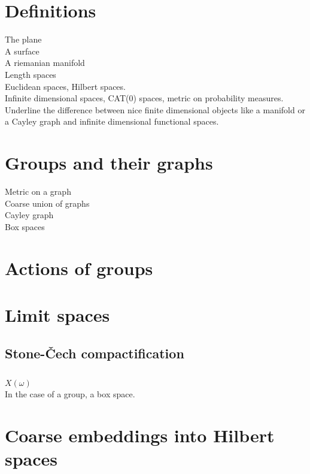 \section{Definitions}

The plane\\
A surface\\
A riemanian manifold\\
Length spaces\\

Euclidean spaces, Hilbert spaces.\\
Infinite dimensional spaces, CAT(0) spaces, metric on probability measures.\\

Underline the difference between nice finite dimensional objects like a manifold or a Cayley graph and infinite dimensional functional spaces.\\

\section{Groups and their graphs}

Metric on a graph \\
Coarse union of graphs\\

Cayley graph\\
Box spaces\\

\section{Actions of groups}

\section{Limit spaces}

\subsection{Stone-\v{C}ech compactification}

\subsection{}

$X(\omega)$ \\

In the case of a group, a box space.

\section{Coarse embeddings into Hilbert spaces}

